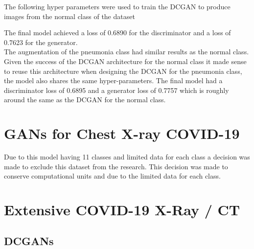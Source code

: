 The following hyper parameters were used to train the DCGAN to produce images from the normal class of the dataset
\begin{table}[H]
    \centering
    \caption{DCGAN for Producing Synthetic Normal Class Data for X-ray COVID19 dataset}
    \label{tab:DCGAN for Producing Synthetic Normal Class Data for X-ray COVID19 dataset}
\end{table}
The final model achieved a loss of 0.6890 for the discriminator and a loss of 0.7623 for the generator.
\\
The augmentation of the pneumonia class had similar results as the normal class.  Given the success of the DCGAN architecture for the normal class it made sense to reuse this architecture when designing the DCGAN for the pneumonia class, the model also shares the same hyper-parameters.  The final model had a discriminator loss of 0.6895 and a generator loss of 0.7757 which is roughly around the same as the DCGAN for the normal class.
\section{GANs for Chest X-ray COVID-19}
Due to this model having 11 classes and limited data for each class a decision was made to exclude this dataset from the research.  This decision was made to conserve computational units and due to the limited data for each class.
\section{Extensive COVID-19 X-Ray / CT}
\subsection{DCGANs}
